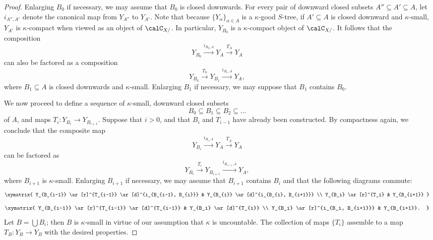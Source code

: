 \begin{CategoryTheory}
\begin{Didn't Read}
\begin{proof}
Enlarging $B_0$ if necessary, we may assume that $B_0$ is closed downwards. 
For every pair of downward closed subsets $A'' \subseteq A' \subseteq A$, let
$i_{A'',A'}$ denote the canonical map from $Y_{A''}$ to $Y_{A'}$.
Note that because $\{ Y_{\alpha} \}_{\alpha \in A}$ is a $\kappa$-good $S$-tree, if
$A' \subseteq A$ is closed downward and $\kappa$-small, $Y_{A'}$ is $\kappa$-compact when 
viewed as an object of $\calC_{X/}$. In particular, $Y_{B_0}$ is a $\kappa$-compact object of $\calC_{X/}$. It follows that the composition
$$ Y_{B_0} \stackrel{i_{B_0,A}}{\rightarrow} Y_{A} \stackrel{T_A}{\rightarrow} Y_{A}$$
can also be factored as a composition
$$ Y_{B_0} \stackrel{T_0}{\rightarrow} Y_{B_1} \stackrel{ i_{B_1,A}}{\rightarrow} Y_A,$$
where $B_1 \subseteq A$ is closed downwards and $\kappa$-small. Enlarging $B_1$ if necessary, we may suppose that $B_1$ contains $B_0$.

We now proceed to define a sequence of $\kappa$-small, downward closed subsets
$$ B_0 \subseteq B_1 \subseteq B_2 \subseteq \ldots $$
of $A$, and maps $T_i: Y_{B_i} \rightarrow Y_{B_{i+1}}$. Suppose that $i > 0$, and that
$B_{i}$ and $T_{i-1}$ have already been constructed. By compactness again, we conclude that the composite map
$$ Y_{B_i} \stackrel{ i_{B_i, A}}{\rightarrow} Y_{A} \stackrel{T_A}{\rightarrow} Y_A $$
can be factored as
$$ Y_{B_i} \stackrel{ T_{i} }{\rightarrow} Y_{B_{i+1} } \stackrel{ i_{B_{i+1}, A}}{\rightarrow} Y_A,$$
where $B_{i+1}$ is $\kappa$-small. Enlarging $B_{i+1}$ if necessary, we may assume that
$B_{i+1}$ contains $B_{i}$ and that the following diagrams commute:
$$ \xymatrix{ Y_{B_{i-1}} \ar[r]^{T_{i-1}} \ar[d]^{i_{B_{i-1}, B_{i}}} & Y_{B_{i}} \ar[d]^{i_{B_{i}, B_{i+1}}} \\
Y_{B_i} \ar[r]^{T_i} & Y_{B_{i+1}} }$$
$$ \xymatrix{ Y_{B_{i-1}} \ar[r]^{T_{i-1}} \ar[d]^{T_{i-1}} & Y_{B_i} \ar[d]^{T_{i}} \\
Y_{B_i} \ar[r]^{i_{B_i, B_{i+1}}} & Y_{B_{i+1}}. }$$
Let $B = \bigcup B_i$; then $B$ is $\kappa$-small in virtue of our assumption that $\kappa$ is uncountable. The collection of maps $\{ T_i \}$ assemble to a map $T_{B}: Y_{B} \rightarrow Y_{B}$ with the desired properties.
\end{proof}


\end{Didn't Read}
\end{CategoryTheory}
